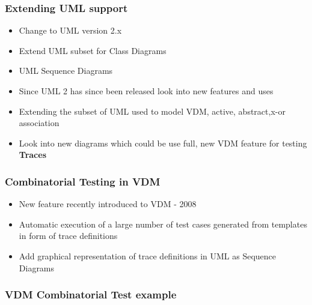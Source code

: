 %
%
\frame
{
  \frametitle{Extending UML support}

  \begin{itemize}
	\itemsep=1cm
  		\item<1-> Change to UML version 2.x
  		\item<2-> Extend UML subset for Class Diagrams
  		\item<3-> UML Sequence Diagrams
	  	
  \end{itemize}


}

\note
{

  \begin{itemize}
  		\item Since UML 2 has since been released look into new features and uses
  		\item Extending the subset of UML used to model VDM, active, abstract,x-or association
  		\item Look into new diagrams which could be use full, new VDM feature for testing \textbf{Traces}
	  	
  \end{itemize}

}


%
%
\frame
{
  \frametitle{Combinatorial Testing in VDM}

  \begin{itemize}
  		\item<1-> New feature recently introduced to VDM - 2008
  		\item<2-> Automatic execution of a large number of test cases generated from templates in form of trace definitions
  		\item<3-> Add graphical representation of trace definitions in UML as Sequence Diagrams
	  	
  \end{itemize}


}

%
%
\frame
{
  \frametitle{VDM Combinatorial Test example}
\begin{center}

\end{center}
}

